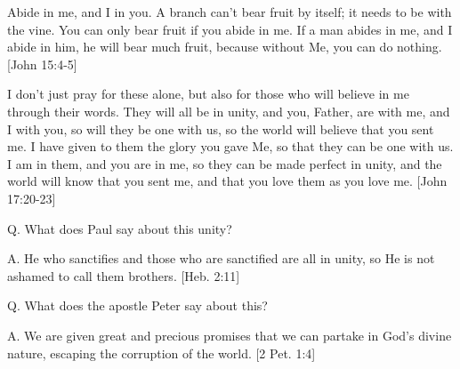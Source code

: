 \documentclass[../main.tex]{subfiles}
\begin{document}
	Abide in me, and I in you. A branch can't bear fruit by itself; it needs to be with the vine.  You can only bear fruit if you abide in me. If a man abides in me, and I abide in him, he will bear much fruit, because without Me, you can do nothing. [John 15:4-5]

	I don't just pray for these alone, but also for those who will believe in me through their words. They will all be in unity, and you, Father, are with me, and I with you, so will they be one with us, so the world will believe that you sent me. I have given to them the glory you gave Me, so that they can be one with us. I am in them, and you are in me, so they can be made perfect in unity, and the world will know that you sent me, and that you love them as you love me. [John 17:20-23]

	Q. What does Paul say about this unity?

	A. He who sanctifies and those who are sanctified are all in unity, so He is not ashamed to call them brothers. [Heb. 2:11]

	Q. What does the apostle Peter say about this?

	A. We are given great and precious promises that we can partake in God's divine nature, escaping the corruption of the world. [2 Pet. 1:4]
\end{document}
